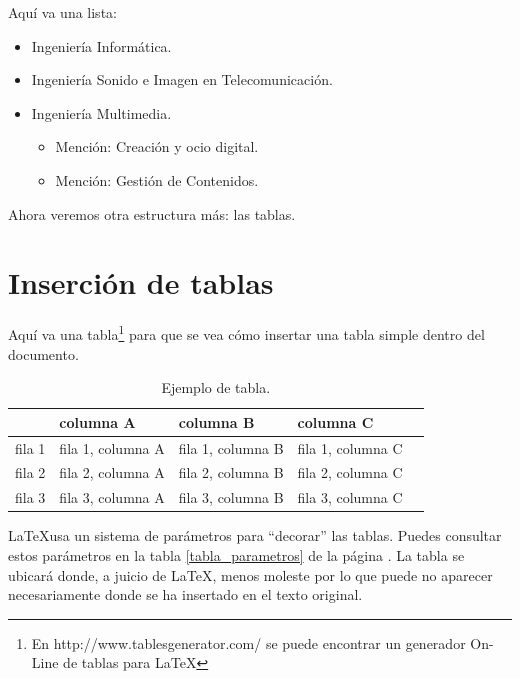 Aquí va una lista:
\begin{itemize}
    \item Ingeniería Informática.
    \item Ingeniería Sonido e Imagen en Telecomunicación.
    \item Ingeniería Multimedia.
    \begin{itemize}
         \item Mención: Creación y ocio digital.
         \item Mención: Gestión de Contenidos.
    \end{itemize}
\end{itemize}

Ahora veremos otra estructura más: las tablas.

\section{Inserción de tablas}

Aquí va una tabla\footnote{En http://www.tablesgenerator.com/ se puede encontrar un generador On-Line de tablas para \LaTeX} para que se vea cómo insertar una tabla simple dentro del documento.

\begin{table}[h]
\begin{center}
\begin{tabular}{lllll}
&columna A&columna B&columna C\\
\hline
fila 1&fila 1, columna A & fila 1, columna B & fila 1, columna C\\
fila 2&fila 2, columna A & fila 2, columna B & fila 2, columna C\\
fila 3&fila 3, columna A & fila 3, columna B & fila 3, columna C\\ \hline
\end{tabular}
\end{center}
\caption{Ejemplo de tabla.}
\label{tabladeejemplo}
\end{table}

\LaTeX usa un sistema de parámetros para ``decorar'' las tablas. Puedes consultar estos parámetros en la tabla \ref{tabla_parametros} de la página \pageref{tabla_parametros}. La tabla se ubicará donde, a juicio de \LaTeX, menos moleste por lo que puede no aparecer necesariamente donde se ha insertado en el texto original. 

